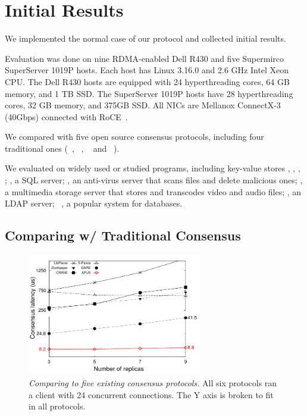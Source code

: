 \section{Initial Results} \label{sec:evaluation}
We implemented the normal case of our protocol and collected initial 
results.

Evaluation was done on nine RDMA-enabled Dell R430 and five Supermirco 
SuperServer 1019P hosts. Each host has Linux 3.16.0 and 2.6 GHz Intel Xeon 
CPU. The Dell R430 hosts are equipped with 24 hyperthreading cores, 64 GB 
memory, and 1 TB SSD. The SuperServer 1019P hosts have 28 hyperthreading 
cores, 32 GB memory, and 375GB SSD. All NICs are Mellanox ConnectX-3 (40Gbps) 
connected with RoCE~\cite{roce}.

We compared \xxx with five open source consensus protocols, including four 
traditional ones (\libpaxos~\cite{libpaxos}, \zookeeper~\cite{zookeeper}, 
\crane~\cite{crane:sosp15} and \spaxos~\cite{spaxos:srds12}).

We evaluated \xxx on \nprog widely used or studied programs, including
\nkvprog key-value stores \redis, \memcached, \ssdb, \mongodb; \mysql, a SQL
server; \clamav, an anti-virus server that scans files and delete malicious 
ones; \mediatomb, a multimedia storage server that stores and transcodes video 
and audio files; \openldap, an LDAP server; \calvin~\cite{calvin:sigmod12}, a 
popular \smr system for databases.

\subsection{Comparing w/ Traditional Consensus}
\label{sec:eval-traditional}

\begin{figure}[t]
\begin{center}
\includegraphics[width=3in]{figures/traditional_paxos_latency}
\caption{{\em Comparing \xxx to five existing consensus protocols.} All 
six protocols ran a client with 24 concurrent connections. The Y axis is 
broken to fit in all protocols.}
\label{fig:scalability}
\end{center}
\end{figure}

